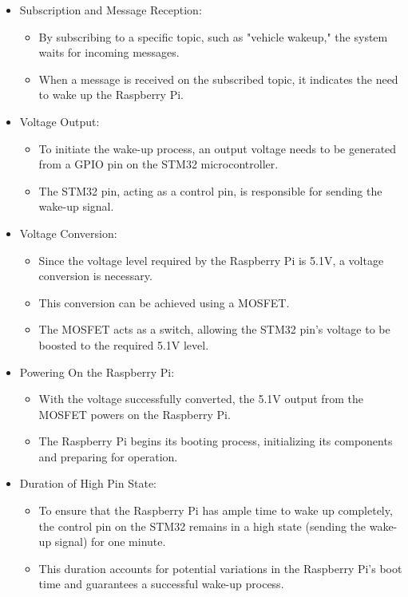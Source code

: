 \documentclass[
12pt,
oneside, 
onehalfspacing, 
nolistspacing, 
parskip, 
chapterinoneline, 
]{AASTCOMPUTER}
\begin{document}
\begin{itemize}
  \item Subscription and Message Reception:
    \begin{itemize}
      \item By subscribing to a specific topic, such as "vehicle wakeup," the system waits for incoming messages.
      \item When a message is received on the subscribed topic, it indicates the need to wake up the Raspberry Pi.
    \end{itemize}
  \item Voltage Output:
    \begin{itemize}
      \item To initiate the wake-up process, an output voltage needs to be generated from a GPIO pin on the STM32 microcontroller.
      \item The STM32 pin, acting as a control pin, is responsible for sending the wake-up signal.
    \end{itemize}
  \item Voltage Conversion:
    \begin{itemize}
      \item Since the voltage level required by the Raspberry Pi is 5.1V, a voltage conversion is necessary.
      \item This conversion can be achieved using a MOSFET.
      \item The MOSFET acts as a switch, allowing the STM32 pin's voltage to be boosted to the required 5.1V level.
    \end{itemize}
  \item Powering On the Raspberry Pi:
    \begin{itemize}
      \item With the voltage successfully converted, the 5.1V output from the MOSFET powers on the Raspberry Pi.
      \item The Raspberry Pi begins its booting process, initializing its components and preparing for operation.
    \end{itemize}
  \item Duration of High Pin State:
    \begin{itemize}
      \item To ensure that the Raspberry Pi has ample time to wake up completely, the control pin on the STM32 remains in a high state (sending the wake-up signal) for one minute.
      \item This duration accounts for potential variations in the Raspberry Pi's boot time and guarantees a successful wake-up process.
    \end{itemize}
\end{itemize}
\end{document}

